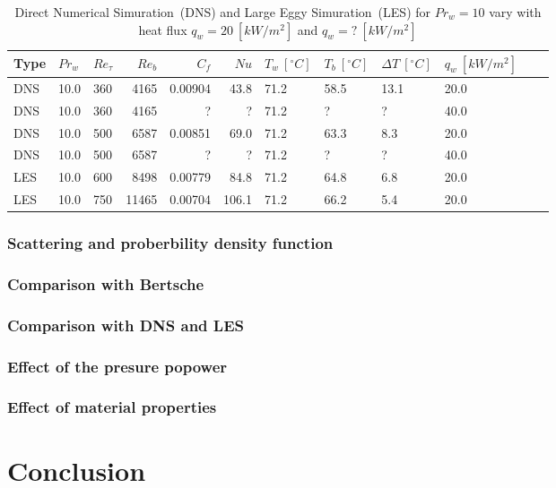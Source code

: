 \documentclass[12pt,oneside]{jbook}
\begin{document}
\begin{table}[h]
\centering
\caption{Direct Numerical Simuration\ (DNS) and Large Eggy Simuration\ (LES) for $Pr_{w} = 10$ vary with heat flux $q_{w}=20\ [kW/m^{2}]$ and $q_{w}=?\ [kW/m^{2}]$}
\vspace{1zh}
\label{simuration}
\begin{tabular}{lllrrrllllrl} \toprule
{Type} & {$Pr_{w}$} & {$Re_{\tau}$}& {$Re_{b}$} & {$C_{f}$} & {$Nu$} & {$T_{w}\ [^\circ C]$} & {$T_{b}\ [^\circ C]$}  & {$\Delta T\ [^\circ C]$}  & {$q_{w}\ [kW/m^{2}]$} \\ \midrule
DNS & 10.0 & 360 & 4165  & 0.00904 & 43.8  & 71.2 & 58.5 & 13.1 & 20.0  \\
DNS & 10.0 & 360 & 4165  & ?       & ?     & 71.2 & ?    & ?    & 40.0  \\ \midrule
DNS & 10.0 & 500 & 6587  & 0.00851 & 69.0  & 71.2 & 63.3 & 8.3  & 20.0 \\
DNS & 10.0 & 500 & 6587  & ?       & ?     & 71.2 & ?    & ?    & 40.0 \\ \midrule
LES & 10.0 & 600 & 8498  & 0.00779 & 84.8  & 71.2 & 64.8 & 6.8  & 20.0 \\ \midrule
LES & 10.0 & 750 & 11465 & 0.00704 & 106.1 & 71.2 & 66.2 & 5.4  & 20.0 \\ \bottomrule
\end{tabular}
\end{table}

\subsection{Scattering and proberbility density function}
\subsection{Comparison with Bertsche}
\subsection{Comparison with DNS and LES}
\subsection{Effect of the presure popower}
\subsection{Effect of material properties}
\subsection{}
\chapter{Conclusion}


\appendix




\end{document}
